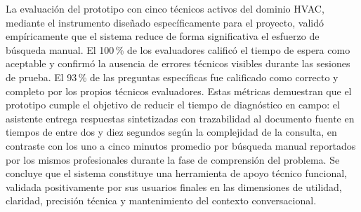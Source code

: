 {La evaluación del prototipo con cinco técnicos activos del dominio HVAC, mediante el instrumento diseñado específicamente para el proyecto, validó empíricamente que el sistema reduce de forma significativa el esfuerzo de búsqueda manual. El 100\,\% de los evaluadores calificó el tiempo de espera como aceptable y confirmó la ausencia de errores técnicos visibles durante las sesiones de prueba. El 93\,\% de las preguntas específicas fue calificado como correcto y completo por los propios técnicos evaluadores. Estas métricas demuestran que el prototipo cumple el objetivo de reducir el tiempo de diagnóstico en campo: el asistente entrega respuestas sintetizadas con trazabilidad al documento fuente en tiempos de entre dos y diez segundos según la complejidad de la consulta, en contraste con los uno a cinco minutos promedio por búsqueda manual reportados por los mismos profesionales durante la fase de comprensión del problema. Se concluye que el sistema constituye una herramienta de apoyo técnico funcional, validada positivamente por sus usuarios finales en las dimensiones de utilidad, claridad, precisión técnica y mantenimiento del contexto conversacional.

}{}

